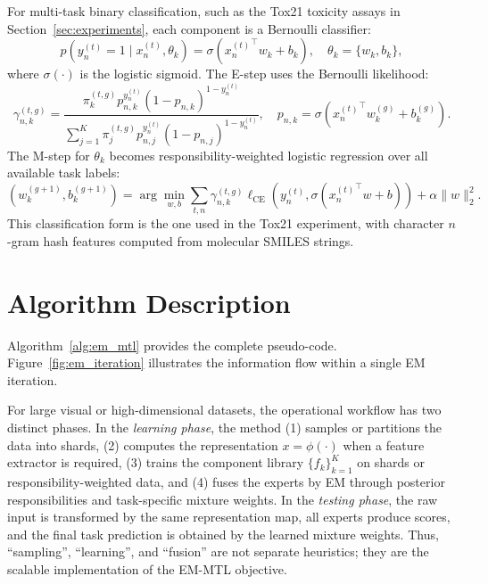 \documentclass[preprint,12pt]{elsarticle}
\begin{document}
	For multi-task binary classification, such as the Tox21 toxicity assays
	in Section~\ref{sec:experiments}, each component is a Bernoulli
	classifier:
	\begin{equation}
		p(y_n^{(t)}=1\mid x_n^{(t)},\theta_k)
		=
		\sigma\!\left({x_n^{(t)}}^\top w_k+b_k\right),
		\quad
		\theta_k=\{w_k,b_k\},
		\label{eq:bernoulli_component}
	\end{equation}
	where $\sigma(\cdot)$ is the logistic sigmoid. The E-step uses the
	Bernoulli likelihood:
	\begin{equation}
		\gamma_{n,k}^{(t,g)}
		=
		\frac{\pi_k^{(t,g)}
		p_{n,k}^{y_n^{(t)}}(1-p_{n,k})^{1-y_n^{(t)}}}
		{\sum_{j=1}^K \pi_j^{(t,g)}
		p_{n,j}^{y_n^{(t)}}(1-p_{n,j})^{1-y_n^{(t)}}},
		\quad
		p_{n,k}=\sigma({x_n^{(t)}}^\top w_k^{(g)}+b_k^{(g)}).
		\label{eq:bernoulli_estep}
	\end{equation}
	The M-step for $\theta_k$ becomes responsibility-weighted logistic
	regression over all available task labels:
	\begin{equation}
		(w_k^{(g+1)},b_k^{(g+1)})
		=
		\arg\min_{w,b}
		\sum_{t,n}\gamma_{n,k}^{(t,g)}
		\ell_{\mathrm{CE}}\!\left(y_n^{(t)},\sigma({x_n^{(t)}}^\top w+b)\right)
		+\alpha\|w\|_2^2 .
		\label{eq:weighted_logistic_mstep}
	\end{equation}
	This classification form is the one used in the Tox21 experiment, with
	character $n$-gram hash features computed from molecular SMILES strings.
	
	\section{Algorithm Description}
	\label{sec:algorithm}
	
	Algorithm~\ref{alg:em_mtl} provides the complete pseudo-code.
	Figure~\ref{fig:em_iteration} illustrates the information flow within
	a single EM iteration.

	For large visual or high-dimensional datasets, the operational workflow
	has two distinct phases. In the \emph{learning phase}, the method
	(1) samples or partitions the data into shards, (2) computes the
	representation $x=\phi(\cdot)$ when a feature extractor is required,
	(3) trains the component library $\{f_k\}_{k=1}^K$ on shards or
	responsibility-weighted data, and (4) fuses the experts by EM through
	posterior responsibilities and task-specific mixture weights. In the
	\emph{testing phase}, the raw input is transformed by the same
	representation map, all experts produce scores, and the final task
	prediction is obtained by the learned mixture weights. Thus,
	``sampling'', ``learning'', and ``fusion'' are not separate heuristics;
	they are the scalable implementation of the EM-MTL objective.
	
\end{document}
